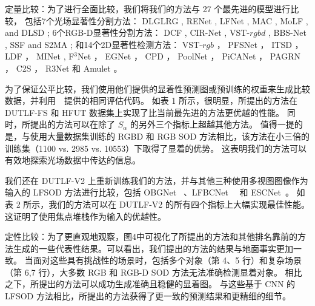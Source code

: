 定量比较：为了进行全面比较，我们将我们的方法与 27 个最先进的模型进行比较，
包括7个光场显著性分割方法：
DLGLRG \cite{liu2021light}, RENet \cite{piao2020exploit}, LFNet \cite{zhang2020lfnet},
MAC \cite{zhang2020light}, MoLF \cite{zhang2019memory}, and DLSD \cite{piao2019deep};
%
%
%
%
6个RGB-D显著性分割方法：
DCF \cite{ji2021calibrated}, CIR-Net \cite{cong2022cir}, VST-$rgbd$  \cite{liu2021visual},
BBS-Net     \cite{fan2020bbs}, SSF     \cite{zhang2020select} and S2MA    \cite{liu2020learning};
%
%
%
%
%
和14个2D显著性检测方法：
VST-$rgb$ \cite{liu2021visual}，
PFSNet \cite{ma2021pyramidal}，
ITSD \cite{zhou2020interactive}，
LDF \cite{wei2020label}，
MINet \cite{pang2020multi}, 
F$^{3}$Net  \cite{wei2020f3net}， 
EGNet   \cite{zhao2019egnet}，
CPD  \cite{wu2019cascaded}，
PoolNet \cite{liu2019simple}，
PiCANet \cite{liu2018picanet}，
PAGRN \cite{wang2018detect}，
C2S   \cite{li2018contour}，
R3Net  \cite{deng2018r3net}
和
Amulet \cite{zhang2017amulet}
。
%
%
%
%
%
\par
%
%
为了保证公平比较，我们使用他们提供的显着性预测图或预训练的权重来生成比较数据，并利用~\cite{liu2021visual}~提供的相同评估代码。 如表 1 所示，很明显，所提出的方法在 DUTLF-FS 和 HFUT 数据集上实现了比当前最先进的方法更优越的性能。 同时，所提出的方法可以在除了 $ S_{\alpha} $ 的另外三个指标上超越其他方法。 值得一提的是，与使用大量数据集训练的 RGBD 和 RGB SOD 方法相比，该方法在小三倍的训练集（1100 vs. 2985 vs. 10553）下取得了显着的优势。 这表明我们的方法可以有效地探索光场数据中传达的信息。 
%
%
%
%
\par
%
%
%
我们还在 DUTLF-V2 上重新训练我们的方法，并与其他三种使用多视图图像作为输入的 LFSOD 方法进行比较，包括 OBGNet ~\cite{jing2021occlusion}、LFBCNet~\cite{wang2022lfbcnet}~ 和 ESCNet~\cite{zhang2022exploring}。 如表 2 所示，我们的方法可以在 DUTLF-V2 的所有四个指标上大幅实现最佳性能。 这证明了使用焦点堆栈作为输入的优越性。 
%
%
%
%
%
\par
%
%
定性比较：为了更直观地观察，图4中可视化了所提出的方法和其他排名靠前的方法生成的一些代表性结果。可以看出，我们提出的方法的结果与地面事实更加一致。 当面对这些具有挑战性的场景时，包括多个对象（第 4、5 行）和复杂场景（第 6,7 行），大多数 RGB 和 RGB-D SOD 方法无法准确检测显着对象。 相比之下，所提出的方法可以成功生成准确且稳健的显着图。 与这些基于 CNN 的 LFSOD 方法相比，所提出的方法获得了更一致的预测结果和更精细的细节。

